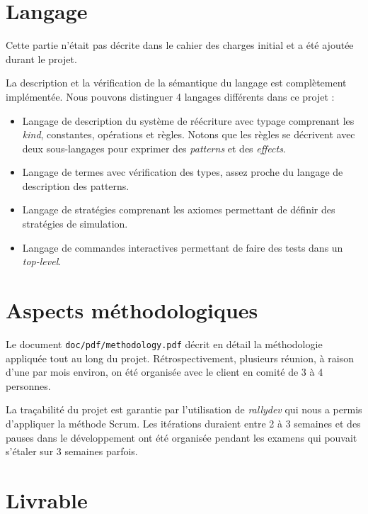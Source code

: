 \documentclass[12pt,a4paper]{article}
\begin{document}
\section{Langage}

Cette partie n'était pas décrite dans le cahier des charges initial et a été ajoutée durant le projet.
\newline

La description et la vérification de la sémantique du langage est complètement implémentée. Nous pouvons distinguer 4 langages différents dans ce projet :
\newline

\begin{itemize}
\item Langage de description du système de réécriture avec typage comprenant les \textit{kind}, constantes, opérations et règles. Notons que les règles se décrivent avec deux sous-langages pour exprimer des \textit{patterns} et des \textit{effects}.
\item Langage de termes avec vérification des types, assez proche du langage de description des patterns.
\item Langage de stratégies comprenant les axiomes permettant de définir des stratégies de simulation.
\item Langage de commandes interactives permettant de faire des tests dans un \textit{top-level}.
\end{itemize}
\vspace{10pt}

\section{Aspects méthodologiques}

Le document \verb=doc/pdf/methodology.pdf= décrit en détail la méthodologie appliquée tout au long du projet. Rétrospectivement, plusieurs réunion, à raison d'une par mois environ, on été organisée avec le client en comité de 3 à 4 personnes.

La traçabilité du projet est garantie par l'utilisation de \textit{rallydev} qui nous a permis d'appliquer la méthode Scrum. Les itérations duraient entre 2 à 3 semaines et des pauses dans le développement ont été organisée pendant les examens qui pouvait s'étaler sur 3 semaines parfois.

\section{Livrable}
\end{document}
